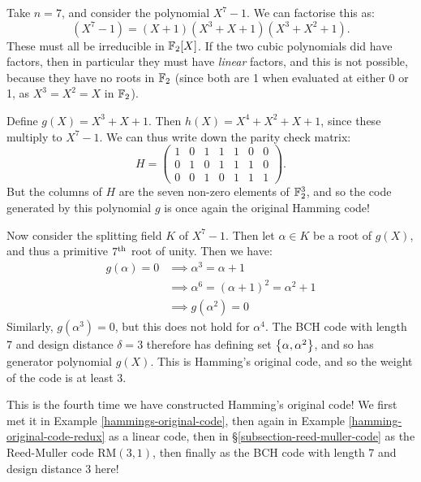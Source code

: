 \documentclass{article}
\begin{document}
\begin{example}
    Take $n = 7$, and consider the polynomial $X^7-1$. We can factorise this as:
    \[
	(X^7 - 1) = (X+1)(X^3 + X + 1)(X^3 + X^2 + 1).
	\]
	These must all be irreducible in $\mathbb{F}_2[X]$. If the two cubic polynomials did have factors, then in particular they must have \textit{linear} factors, and this is not possible, because they have no roots in $\mathbb{F}_2$ (since both are 1 when evaluated at either 0 or 1, as $X^3 = X^2 = X$ in $\mathbb{F}_2$).
	
	Define $g(X) = X^3 + X + 1$. Then $h(X) = X^4 + X^2 + X + 1$, since these multiply to $X^7 -1$. We can thus write down the parity check matrix:
	\[
	H = \begin{pmatrix}
		1 & 0 & 1 & 1 & 1 & 0 & 0 \\
		0 & 1 & 0 & 1 & 1 & 1 & 0 \\
		0 & 0 & 1 & 0 & 1 & 1 & 1
	\end{pmatrix}.
	\]
	But the columns of $H$ are the seven non-zero elements of $\mathbb{F}_2^3$, and so the code generated by this polynomial $g$ is once again the original Hamming code!
	
	Now consider the splitting field $K$ of $X^7 - 1$. Then let $\alpha \in K$ be a root of $g(X)$, and thus a primitive $7^{\text{th}}$ root of unity. Then we have:
	\begin{align*}
		g(\alpha) = 0 &\implies \alpha^3 = \alpha + 1 \\
		&\implies \alpha^6 = (\alpha + 1)^2 = \alpha^2 + 1 \\
		&\implies g(\alpha^2) = 0
	\end{align*}
	Similarly, $g(\alpha^3) = 0$, but this does not hold for $\alpha^4$. The BCH code with length 7 and design distance $\delta = 3$ therefore has defining set $\left\lbrace \alpha, \alpha^2 \right\rbrace$, and so has generator polynomial $g(X)$. This is Hamming's original code, and so the weight of the code is at least 3.
\end{example}

\begin{note}
	This is the fourth time we have constructed Hamming's original code! We first met it in Example \ref{hammings-original-code}, then again in Example \ref{hamming-original-code-redux} as a linear code, then in \S\ref{subsection-reed-muller-code} as the Reed-Muller code $\mathrm{RM}(3, 1)$, then finally as the BCH code with length 7 and design distance 3 here!
\end{note}
\end{document}
